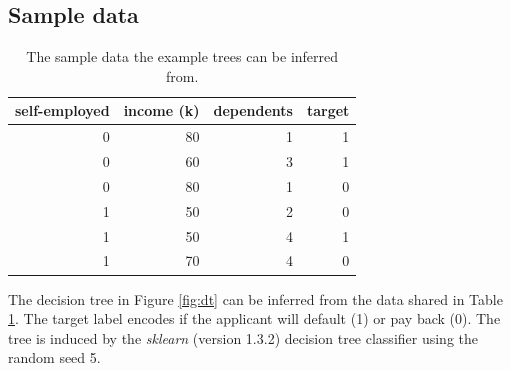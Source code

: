 \documentclass[sn-mathphys]{sn-jnl}%
\theoremstyle{thmstyleone}%
\theoremstyle{thmstyletwo}%
\theoremstyle{thmstylethree}%
\begin{document}


\begin{appendices}

    \section{Sample data}
    \label{sec:sample}
    
    

    \begin{table}
        \caption{The sample data the example trees can be inferred from.}
        \label{tab:sample}
    \begin{center}
      \begin{tabular}{rrrr}
          \toprule
          self-employed & income (k) & dependents & target \\
          \midrule
          0 & 80 & 1 & 1 \\
          0 & 60 & 3 & 1 \\
          0 & 80 & 1 & 0 \\
          1 & 50 & 2 & 0 \\
          1 & 50 & 4 & 1 \\
          1 & 70 & 4 & 0 \\
          \bottomrule
        \end{tabular}
    \end{center}
    \end{table}

    The decision tree in Figure \ref{fig:dt} can be inferred from the data shared in Table \ref{tab:sample}.
    The target label encodes if the applicant will default (1) or pay back (0). The tree is induced by the \emph{sklearn} (version 1.3.2) \citep{sklearn} decision tree classifier using the random seed 5.
    




\end{appendices}
\end{document}
